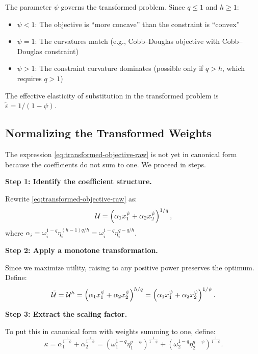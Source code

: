 \begin{calloutimportant}
The parameter $\psi$ governs the transformed problem. Since $q \leq 1$ and $h \geq 1$:
\begin{itemize}[leftmargin=*]
    \item $\psi < 1$: The objective is ``more concave'' than the constraint is ``convex''
    \item $\psi = 1$: The curvatures match (e.g., Cobb--Douglas objective with Cobb--Douglas constraint)
    \item $\psi > 1$: The constraint curvature dominates (possible only if $q > h$, which requires $q > 1$)
\end{itemize}
The effective elasticity of substitution in the transformed problem is $\tilde{\varepsilon} = 1/(1-\psi)$.
\end{calloutimportant}

\subsection{Normalizing the Transformed Weights}
\label{subsec:normalize-weights}

The expression \eqref{eq:transformed-objective-raw} is not yet in canonical form because the coefficients do not sum to one. We proceed in steps.

\textbf{Step 1: Identify the coefficient structure.}

Rewrite \eqref{eq:transformed-objective-raw} as:
\begin{equation}
\mathcal{U} = \left( \alpha_1 x_1^{\psi} + \alpha_2 x_2^{\psi} \right)^{1/q},
\end{equation}
where $\alpha_i = \omega_i^{1-q} \eta_i^{(h-1)q/h} = \omega_i^{1-q} \eta_i^{q - q/h}$.

\textbf{Step 2: Apply a monotone transformation.}

Since we maximize utility, raising to any positive power preserves the optimum. Define:
\begin{equation}
\tilde{\mathcal{U}} = \mathcal{U}^{h} = \left( \alpha_1 x_1^{\psi} + \alpha_2 x_2^{\psi} \right)^{h/q} = \left( \alpha_1 x_1^{\psi} + \alpha_2 x_2^{\psi} \right)^{1/\psi}.
\end{equation}

\textbf{Step 3: Extract the scaling factor.}

To put this in canonical form with weights summing to one, define:
\begin{equation}
\label{eq:kappa-def}
\kappa = \alpha_1^{\frac{1}{1-\psi}} + \alpha_2^{\frac{1}{1-\psi}} = \left( \omega_1^{1-q} \eta_1^{q-\psi} \right)^{\frac{1}{1-\psi}} + \left( \omega_2^{1-q} \eta_2^{q-\psi} \right)^{\frac{1}{1-\psi}}.
\end{equation}

